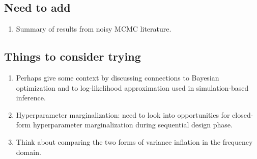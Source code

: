 \documentclass[12pt]{article}
\begin{document}
\subsection{Need to add}
\begin{enumerate}
\item Summary of results from noisy MCMC literature. 
\end{enumerate}

\subsection{Things to consider trying}
\begin{enumerate}
\item Perhaps give some context by discussing connections to Bayesian optimization and to log-likelihood approximation used in 
simulation-based inference. 
\item Hyperparameter marginalization: need to look into opportunities for closed-form hyperparameter marginalization during 
sequential design phase. 
\item Think about comparing the two forms of variance inflation in the frequency domain. 
\end{enumerate}


 

\end{document}

